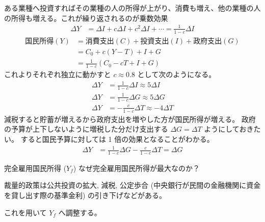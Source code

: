 \documentclass[uplatex,dvipdfmx,a4paper,11pt]{jlreq}
\numberwithin{equation}{section}
\theoremstyle{definition}
\begin{document}
ある業種へ投資すればその業種の人の所得が上がり、消費も増え、他の業種の人の所得も増える。これが繰り返されるのが乗数効果
\begin{align}
  \Delta Y & = \Delta I + c\Delta I + c^2\Delta I +\cdots = \frac{1}{1 - c}\Delta I
\end{align}
\begin{align}
  国民所得 (Y) & = 消費支出 (C) + 投資支出 (I) + 政府支出 (G)    \\
           & = C_0 + c(Y - T) + I + G            \\
           & = \frac{1}{1 - c}(C_0 - cT + I + G)
\end{align}
これよりそれぞれ独立に動かすと $c \approx 0.8$ として次のようになる。
\begin{align}
  \Delta Y & = \frac{1}{1 - c}\Delta I \approx 5\Delta I   \\
  \Delta Y & = \frac{1}{1 - c}\Delta G \approx 5\Delta G   \\
  \Delta Y & = -\frac{c}{1 - c}\Delta T \approx -4\Delta T
\end{align}
減税すると貯蓄が増えるから政府支出を増やした方が国民所得が増える。
政府の予算が上下しないように増税した分だけ支出する $\Delta G = \Delta T$ ようにしておきたい。
すると国民予算に対しては 1 倍の効果となることがわかる。
\begin{align}
  \Delta Y & = \frac{1}{1 - c}\Delta G - \frac{c}{1 - c}\Delta T = \Delta G
\end{align}

完全雇用国民所得 ($Y_f$)
なぜ完全雇用国民所得が最大なのか？

裁量的政策は公共投資の拡大, 減税, 公定歩合 (中央銀行が民間の金融機関に資金を貸し出す際の基準金利) の引き下げなどがある。

これを用いて $Y_f$ へ調整する。
\end{document}
